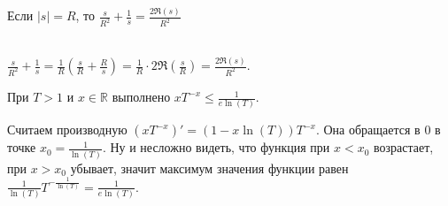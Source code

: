 \begin{lemma} \label{l5_lm14}
	Если $|s| = R$, то $\displaystyle \frac{s}{R^2} + \frac{1}{s} = \frac{2 \Re(s)}{R^2}$
\end{lemma}
\begin{pf}~\\
    $\displaystyle \frac{s}{R^2} + \frac{1}{s} = \frac{1}{R} \left( \frac{s}{R} + \frac{R}{s} \right) = \frac{1}{R} \cdot 2 \Re\left(\frac{s}{R}\right) = \frac{2 \Re(s)}{R^2}$.
\end{pf} 

\begin{lemma} \label{l5_lm15}
    При $T > 1$ и $x \in \mathbb{R}$ выполнено $\displaystyle x T^{-x} \leq \frac{1}{e \ln(T)}$.
\end{lemma}
\begin{pf}
	Считаем производную $\displaystyle (x T^{-x})' = (1 - x \ln(T))T^{-x}$.  Она обращается в $0$ в точке $\displaystyle x_0 = \frac{1}{\ln(T)}$. Ну и несложно видеть, что функция при $x < x_0$ возрастает, при $x > x_0$ убывает, значит максимум значения функции равен $\displaystyle \frac{1}{\ln (T)} T^{-\frac{1}{\ln(T)}} = \frac{1}{e \ln(T)}$.
\end{pf}


